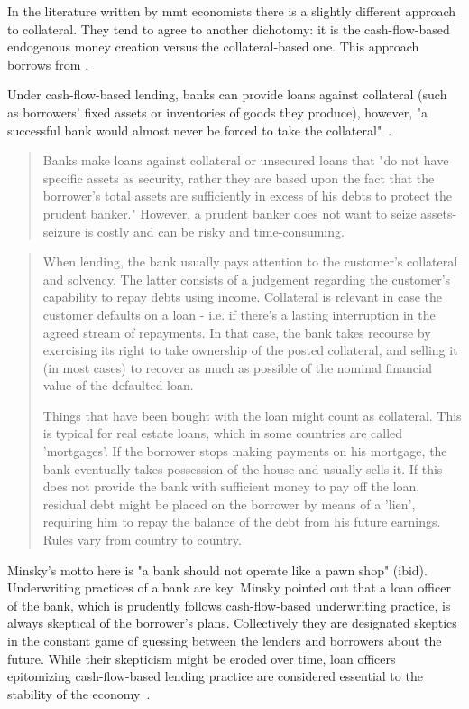 In the literature written by \ac{mmt} economists there is a slightly different approach to collateral. They tend to agree to another dichotomy: it is the cash-flow-based endogenous money creation versus the collateral-based one. This approach borrows from \citeauthor{minsky1986}.

Under cash-flow-based lending, banks can provide loans against collateral (such as borrowers' fixed assets or inventories of goods they produce), however, "a successful bank would almost never be forced to take the collateral"~\citep[p.~104]{wray2016}.

\begin{quote}
Banks make loans against collateral or unsecured loans that "do 
not have specific assets as security, rather they are based upon 
the fact that the borrower's total assets are sufficiently in excess 
of his debts to protect the prudent banker." However, a prudent 
banker does not want to seize assets-seizure is costly and can 
be risky and time-consuming.~\citep[p.~169]{wray2016}
\end{quote}

\begin{quote}
When lending, the bank usually pays attention to the customer's collateral and 
solvency. The latter consists of a judgement regarding the customer's capability to 
repay debts using income. Collateral is relevant in case the customer defaults on a 
loan - i.e. if there's a lasting interruption in the agreed stream of repayments. In 
that case, the bank takes recourse by exercising its right to take ownership of the 
posted collateral, and selling it (in most cases) to recover as much as possible of 
the nominal financial value of the defaulted loan.\par 
Things that have been bought with the loan might count as collateral. This is 
typical for real estate loans, which in some countries are called 'mortgages'. If 
the borrower stops making payments on his mortgage, the bank eventually takes 
possession of the house and usually sells it. If this does not provide the bank 
with sufficient money to pay off the loan, residual debt might be placed on the 
borrower by means of a 'lien', requiring him to repay the balance of the debt 
from his future earnings. Rules vary from country to country.~\citep[p.~58-59]{ehnts2017}
\end{quote}

Minsky's motto here is "a bank should not operate like a pawn shop" (ibid). Underwriting practices of a bank are key. Minsky pointed out that a loan officer of the bank, which is prudently follows cash-flow-based underwriting practice, is always skeptical of the borrower's plans. Collectively they are designated skeptics in the constant game of guessing between the lenders and borrowers about the future. While their skepticism might be eroded over time, loan officers epitomizing cash-flow-based lending practice are considered essential to the stability of the economy~\citep[p.~125]{tymoigne2009}.

